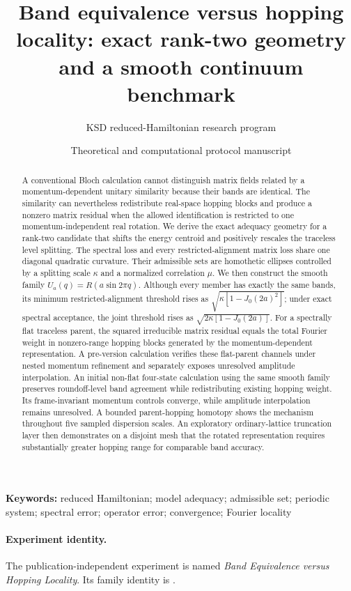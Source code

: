 \documentclass[11pt]{article}
\title{\textbf{Band equivalence versus hopping locality: exact rank-two geometry
and a smooth continuum benchmark}}
\author{KSD reduced-Hamiltonian research program}
\date{Theoretical and computational protocol manuscript}
\begin{document}
\maketitle

\begin{abstract}
A conventional Bloch calculation cannot distinguish matrix fields related by a
momentum-dependent unitary similarity because their bands are identical. The similarity
can nevertheless redistribute real-space hopping blocks and produce a nonzero matrix
residual when the allowed identification is restricted to one momentum-independent real
rotation. We derive the exact adequacy geometry for a rank-two candidate that shifts the
energy centroid and positively rescales the traceless level splitting. The spectral loss
and every restricted-alignment matrix loss share one diagonal quadratic curvature. Their
admissible sets are homothetic ellipses controlled by a splitting scale $\kappa$ and a
normalized correlation $\mu$. We then construct the smooth family
$U_a(q)=R(a\sin2\pi q)$. Although every member has exactly the same bands, its minimum
restricted-alignment threshold rises as $\sqrt{\kappa[1-J_0(2a)^2]}$; under exact
spectral acceptance, the joint threshold rises as
$\sqrt{2\kappa[1-J_0(2a)]}$. For a spectrally flat traceless parent, the squared
irreducible matrix residual equals the total Fourier weight in nonzero-range hopping
blocks generated by the momentum-dependent representation. A pre-version calculation
verifies these flat-parent channels under nested momentum refinement and separately
exposes unresolved amplitude interpolation. An initial non-flat four-state calculation
using the same smooth family preserves roundoff-level band agreement while redistributing
existing hopping weight. Its frame-invariant momentum controls converge, while amplitude
interpolation remains unresolved. A bounded parent-hopping homotopy shows the mechanism
throughout five sampled dispersion scales. An exploratory ordinary-lattice truncation
layer then demonstrates on a disjoint mesh that the rotated representation requires
substantially greater hopping range for comparable band accuracy.
\end{abstract}

\noindent\textbf{Keywords:} reduced Hamiltonian; model adequacy; admissible set;
periodic system; spectral error; operator error; convergence; Fourier locality

\paragraph{Experiment identity.}
The publication-independent experiment is named \emph{Band Equivalence versus Hopping
Locality}. Its family identity is
.
\end{document}
